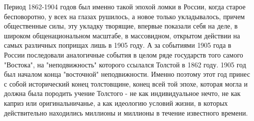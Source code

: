 \documentclass[12pt]{article}
\newcommand{\parnum}{(\arabic{parcount})}
\newcounter{parcount}
\newenvironment{parnumbers}{%
  \par%
  \everypar{\noindent \stepcounter{parcount}\marginpar[]{\parnum}}%
}{}
\begin{document}
\begin{parnumbers}
Период 1862-1904 годов был именно такой эпохой ломки в России, когда старое бесповоротно, у всех на глазах рушилось, а новое только укладывалось, причем общественные силы, эту укладку творящие, впервые показали себя на деле, в широком общенациональном масштабе, в массовидном, открытом действии на самых различных поприщах лишь в 1905 году. А за событиями 1905 года в России последовали аналогичные события в целом ряде государств того самого "Востока", на "неподвижность" которого ссылался Толстой в 1862 году. 1905 год был началом конца "восточной" неподвижности. Именно поэтому этот год принес с собой исторический конец толстовщине, конец всей той эпохе, которая могла и должна была породить учение Толстого - не как индивидуальное нечто, не как каприз или оригинальничанье, а как идеологию условий жизни, в которых действительно находились миллионы и миллионы в течение известного времени.
\end{parnumbers}
\end{document}
